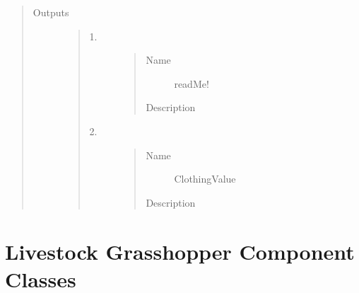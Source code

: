 \documentclass[letterpaper,10pt,english]{sphinxmanual}
\begin{document}
\begin{quote}
\begin{description}
\item[{Outputs}] \leavevmode\begin{quote}\begin{description}
\item[{1.}] \leavevmode\begin{quote}\begin{description}
\item[{Name}] \leavevmode
readMe!

\item[{Description}] \leavevmode
{}

\end{description}\end{quote}

\item[{2.}] \leavevmode\begin{quote}\begin{description}
\item[{Name}] \leavevmode
ClothingValue

\item[{Description}] \leavevmode
{}

\end{description}\end{quote}

\end{description}\end{quote}

\end{description}\end{quote}






\section{Livestock Grasshopper Component Classes}
\label{\detokenize{component_classes:livestock-grasshopper-component-classes}}\label{\detokenize{component_classes:id3}}\label{\detokenize{component_classes:classes}}\label{\detokenize{component_classes::doc}}
\end{document}
